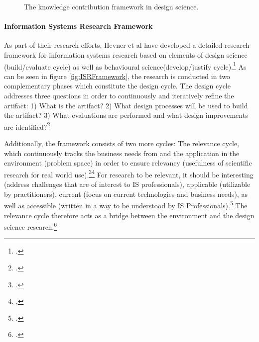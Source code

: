 \begin{figure}
    \centering
    
    \caption[The knowledge contribution framework in design science.]{The knowledge contribution framework in design science.\footnotemark}
    \label{fig:DSRKnowledgeContribution}
\end{figure}

\paragraph{Information Systems Research Framework}  \label{topic:design cycle}
As part of their research efforts, Hevner et al have developed a detailed research framework for information systems research based on elements of design science (build/evaluate cycle) as well as behavioural science(develop/justify cycle).\footcite[Cf.][pp.80 et seq]{HevnerDesignScienceResearch2004}
As can be seen in figure \ref{fig:ISRFramework}, the research is conducted in two complementary phases which constitute the design cycle. The design cycle addresses three questions in order to continuously and iteratively refine the artifact: 1) What is the artifact? 2) What design processes will be used to build the artifact? 3) What evaluations are performed and what design improvements are identified?\footcites[Cf.][p.19]{HevnerDesignResearchInformation2010}[cf.][p.90]{Hevnerthreecycleview2007}[cf.][p.89]{Hevnerthreecycleview2007}

 \label{topic:relevance cycle}
Additionally, the framework consists of two more cycles: The relevance cycle, which continuously tracks the business needs from and the application in the environment (problem space) in order to ensure relevancy (usefulness of scientific research for real world use).\footcites[Cf.][p.70]{Simonsciencesartificial1996}[cf.][p.79]{HevnerDesignScienceResearch2004}\footcite[Cf.][p.129]{ThomasBekannteundweniger2014} For research to be relevant, it should be interesting (address challenges that are of interest to IS professionals), applicable (utilizable by practitioners), current (focus on current technologies and business needs), as well as accessible (written in a way to be understood by IS Professionals).\footcite[Cf.][p.5]{BenbasatEmpiricalresearchinformation1999} The relevance cycle therefore acts as a bridge between the environment and the design science research.\footcite[Cf.][p.89]{Hevnerthreecycleview2007} 

